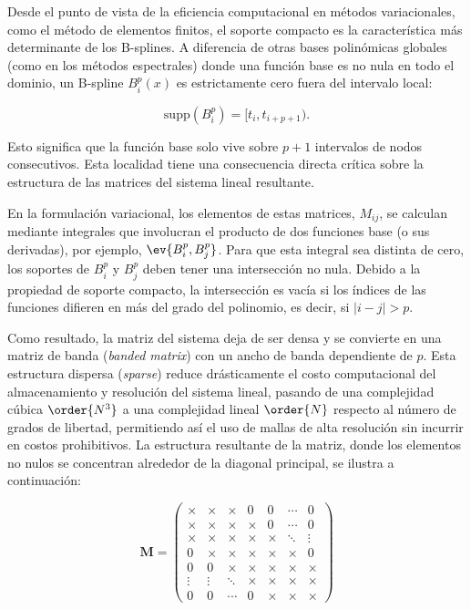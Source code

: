 Desde el punto de vista de la eficiencia computacional en métodos variacionales, como el método de elementos finitos, el soporte compacto es la característica más determinante de los B-splines. A diferencia de otras bases polinómicas globales (como en los métodos espectrales) donde una función base es no nula en todo el dominio, un B-spline \( B_i^p(x) \) es estrictamente cero fuera del intervalo local:

\[ \text{supp}(B_i^p) = [t_i, t_{i+p+1}). \]

Esto significa que la función base solo vive sobre \( p+1 \) intervalos de nodos consecutivos. Esta localidad tiene una consecuencia directa crítica sobre la estructura de las matrices del sistema lineal resultante.

En la formulación variacional, los elementos de estas matrices, \( M_{ij} \), se calculan mediante integrales que involucran el producto de dos funciones base (o sus derivadas), por ejemplo, \( \ev{B_i^p,B_j^p} \). Para que esta integral sea distinta de cero, los soportes de \( B_i^p \) y \( B_j^p \) deben tener una intersección no nula. Debido a la propiedad de soporte compacto, la intersección es vacía si los índices de las funciones difieren en más del grado del polinomio, es decir, si \( |i-j| > p \).

Como resultado, la matriz del sistema deja de ser densa y se convierte en una matriz de banda (\textit{banded matrix}) con un ancho de banda dependiente de \( p \). Esta estructura dispersa (\textit{sparse}) reduce drásticamente el costo computacional del almacenamiento y resolución del sistema lineal, pasando de una complejidad cúbica \( \order{N^3} \) a una complejidad lineal \( \order{N} \) respecto al número de grados de libertad, permitiendo así el uso de mallas de alta resolución sin incurrir en costos prohibitivos. La estructura resultante de la matriz, donde los elementos no nulos se concentran alrededor de la diagonal principal, se ilustra a continuación:

\begin{equation}
\label{eq:banded-matrix}
\mathbf{M} = 
\begin{pmatrix}
\times & \times & \times & 0 & 0 & \cdots & 0 \\
\times & \times & \times & \times & 0 & \cdots & 0 \\
\times & \times & \times & \times & \times & \ddots & \vdots \\
0 & \times & \times & \times & \times & \times & 0 \\
0 & 0 & \times & \times & \times & \times & \times \\
\vdots & \vdots & \ddots & \times & \times & \times & \times \\
0 & 0 & \cdots & 0 & \times & \times & \times
\end{pmatrix}
\end{equation}

